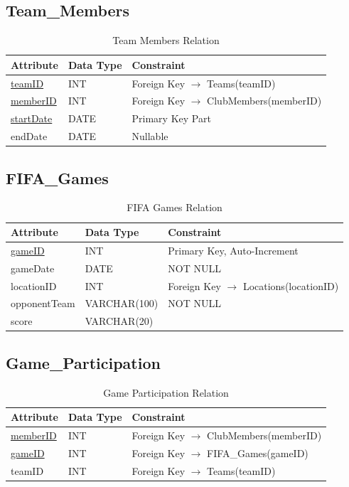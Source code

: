 \documentclass[11pt,a4paper]{article}
\begin{document}
\subsection{Team\_Members}

\begin{table}[H]
\centering
\begin{tabular}{lll}
\toprule
Attribute & Data Type & Constraint \\
\midrule
\underline{teamID} & INT & Foreign Key $\rightarrow$ Teams(teamID) \\
\underline{memberID} & INT & Foreign Key $\rightarrow$ ClubMembers(memberID) \\
\underline{startDate} & DATE & Primary Key Part \\
endDate & DATE & Nullable \\
\bottomrule
\end{tabular}
\caption{Team Members Relation}
\end{table}


\subsection{FIFA\_Games}

\begin{table}[H]
\centering
\begin{tabular}{lll}
\toprule
Attribute & Data Type & Constraint \\
\midrule
\underline{gameID} & INT & Primary Key, Auto-Increment \\
gameDate & DATE & NOT NULL \\
locationID & INT & Foreign Key $\rightarrow$ Locations(locationID) \\
opponentTeam & VARCHAR(100) & NOT NULL \\
score & VARCHAR(20) & \\
\bottomrule
\end{tabular}
\caption{FIFA Games Relation}
\end{table}


\subsection{Game\_Participation}

\begin{table}[H]
\centering
\begin{tabular}{lll}
\toprule
Attribute & Data Type & Constraint \\
\midrule
\underline{memberID} & INT & Foreign Key $\rightarrow$ ClubMembers(memberID) \\
\underline{gameID} & INT & Foreign Key $\rightarrow$ FIFA\_Games(gameID) \\
teamID & INT & Foreign Key $\rightarrow$ Teams(teamID) \\
\bottomrule
\end{tabular}
\caption{Game Participation Relation}
\end{table}
\end{document}
